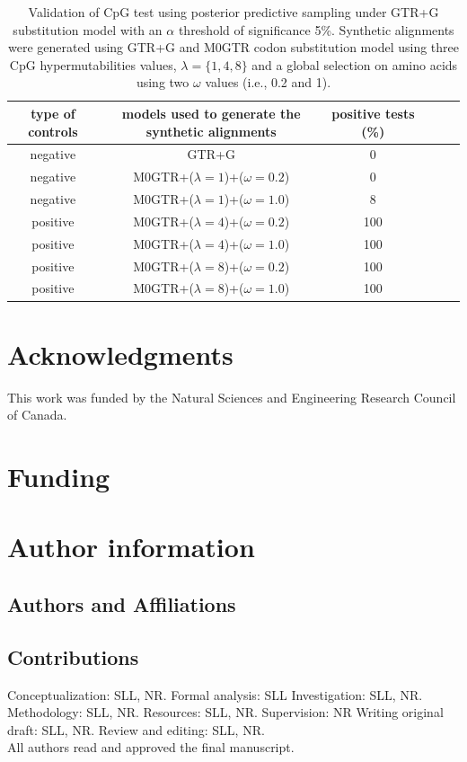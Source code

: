 \documentclass{article}
\begin{document}
\begin{table}[h]
    \begin{tabular}{cccccc}
    type of controls & models used to generate the synthetic alignments & positive tests (\%)\\
    \hline
    negative & GTR+G                              & 0\\
    negative & M0GTR+($\lambda=1$)+($\omega=0.2$) & 0\\
    negative & M0GTR+($\lambda=1$)+($\omega=1.0$) & 8\\
    positive & M0GTR+($\lambda=4$)+($\omega=0.2$) & 100\\
    positive & M0GTR+($\lambda=4$)+($\omega=1.0$) & 100\\
    positive & M0GTR+($\lambda=8$)+($\omega=0.2$) & 100\\
    positive & M0GTR+($\lambda=8$)+($\omega=1.0$) & 100\\
    \hline
    \end{tabular}
    \caption{Validation of CpG test using posterior predictive sampling under GTR+G substitution model with an $\alpha$ threshold of significance 5\%. Synthetic alignments were generated using GTR+G and M0GTR codon substitution model using three CpG hypermutabilities values, $\lambda = \{1,4,8\}$ and a global selection on amino acids using two $\omega$ values (i.e., 0.2 and 1).}\label{table_1}
\end{table}
\newpage


\newpage
\section*{Acknowledgments}
This work was funded by the Natural Sciences and Engineering Research Council of Canada.
\section*{Funding}
\section*{Author information}
\subsection*{Authors and Affiliations}
\subsection*{Contributions}
Conceptualization: SLL, NR. Formal analysis: SLL Investigation: SLL, NR. Methodology: SLL, NR. Resources: SLL, NR. Supervision: NR Writing original draft: SLL, NR. Review and editing: SLL, NR. \\
All authors read and approved the final manuscript.
\end{document}
